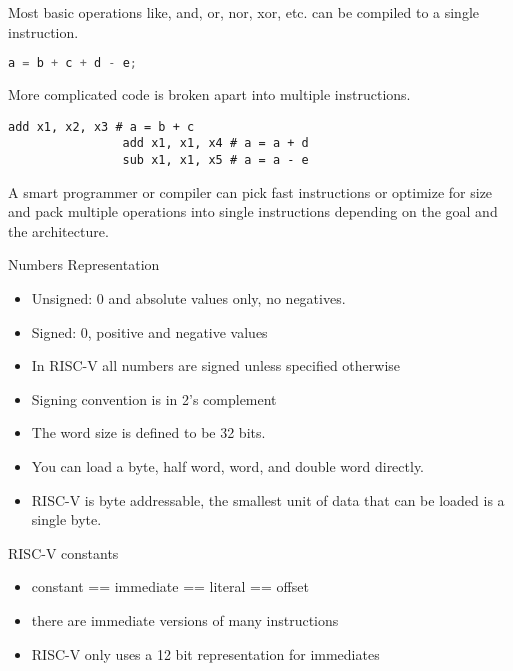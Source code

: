 \documentclass{report}
\begin{document}
\begin{description}
\begin{mdframed}
            Most basic operations like, and, or, nor, xor, etc.
            can be compiled to a single instruction.


            \begin{lstlisting}[language=C]
                a = b + c + d - e;
            \end{lstlisting}

            More complicated code is broken apart into multiple instructions.

            \begin{lstlisting}[language={[x86asm]Assembler}]
                add x1, x2, x3 # a = b + c
                add x1, x1, x4 # a = a + d
                sub x1, x1, x5 # a = a - e
            \end{lstlisting}

            A smart programmer or compiler can pick fast instructions or optimize for size
            and pack multiple operations into single instructions depending on the goal
            and the architecture.
        \end{mdframed}
    \item {\large Numbers Representation}
        \begin{mdframed}
            \begin{itemize}
                \item Unsigned: 0 and absolute values only, no negatives.

                \item Signed: 0, positive and negative values

                \item In RISC-V all numbers are signed unless specified otherwise

                \item Signing convention is in 2's complement

                \item The word size is defined to be 32 bits.

                \item You can load a byte, half word, word, and double word directly.

                \item RISC-V is byte addressable, the smallest unit of data that can be loaded is
                    a single byte.
            \end{itemize}
        \end{mdframed}
    \item {\large RISC-V constants}
        \begin{itemize}
            \item constant == immediate == literal == offset
            \item there are immediate versions of many instructions
            \item RISC-V only uses a 12 bit representation for immediates
                    

\end{itemize}
\end{description}
\end{document}
